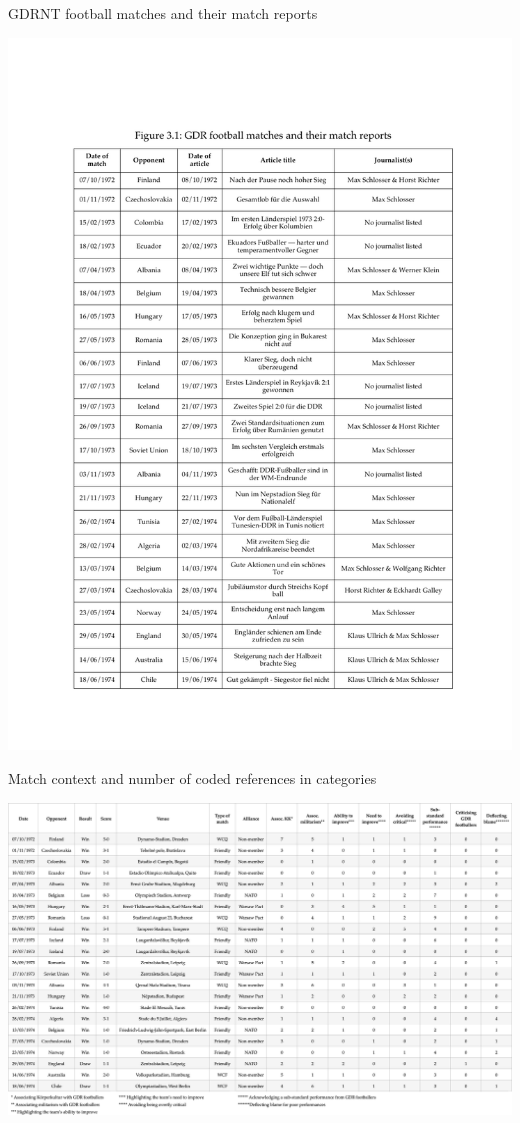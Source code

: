 \newpage
\begin{table}[t]
\caption{GDRNT football matches and their match reports}
\includegraphics[width=\textwidth]{mres/images/figure 3.1.pdf}
\centering
\label{tbl:fig3.1}
\end{table}

\newpage
\begin{landscape}
\begin{table}[!h]
\centering
\caption{Match context and number of coded references in categories}
\includegraphics[width=\linewidth]{mres/images/figure 3.2.png}
\label{tbl:fig3.2}
\end{table}
\end{landscape}

